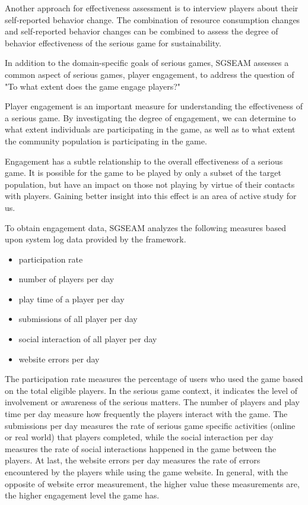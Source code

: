 Another approach for effectiveness assessment is to interview players about their self-reported
behavior change. The combination of resource consumption changes and self-reported behavior changes
can be combined to assess the degree of behavior effectiveness of the serious game for
sustainability.

In addition to the domain-specific goals of serious games, SGSEAM assesses a common
aspect of serious games, player engagement, to address the question of "To what extent does the
game engage players?"

Player engagement is an important measure for understanding the effectiveness of a serious game.
By investigating the degree of engagement, we can determine to what extent individuals are
participating in the game, as well as to what extent the community population is participating in
the game.

Engagement has a subtle relationship to the overall effectiveness of a serious game. It is
possible for the game to be played by only a subset of the target population, but
have an impact on those not playing by virtue of their contacts with players. Gaining
better insight into this effect is an area of active study for us. 

To obtain engagement data, SGSEAM analyzes the following measures
based upon system log data provided by the framework.

\begin{itemize}
\item participation rate
\item number of players per day
\item play time of a player per day
\item submissions of all player per day
\item social interaction of all player per day
\item website errors per day
\end{itemize}

The participation rate measures the percentage of users who used the game based on the total
eligible players. In the serious game context, it indicates the level of involvement or awareness
of the serious matters. The number of players and play time per day measure how frequently the
players interact with the game. The submissions per day measures the rate of serious game
specific activities (online or real world) that players completed, while the social interaction
per day measures the rate of social interactions happened in the game between the players. At
last, the website errors per day measures the rate of errors encountered by the players while
using the game website. In general, with the opposite of website error measurement, the higher
value these measurements are, the higher engagement level the game has.

